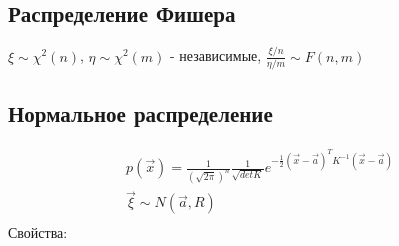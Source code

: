 \documentclass{article}
\begin{document}
\subsection{Распределение Фишера}
$\xi\sim \chi^2(n)$, $\eta\sim \chi^2(m)$ - независимые, $\frac{\xi/n}{\eta/m}\sim F(n,m)$ \\
\subsection{Нормальное распределение}
\begin{gather*}
  p(\vec{x})=\frac{1}{(\sqrt{2\pi})^n}\frac{1}{\sqrt{detK}}e^{-\frac{1}{2}(\vec{x}-\vec{a})^T K^{-1}(\vec{x}-\vec{a})} \\
  \vec{\xi}\sim N(\vec{a},R)\\
\end{gather*}
Свойства:
\end{document}
